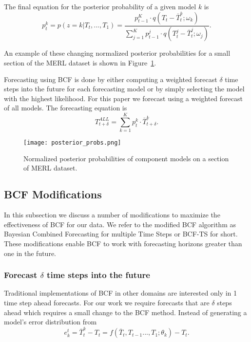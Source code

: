 The final equation for the posterior probability of a given model $k$ is
\begin{equation}
\label{eq:model_prob}
p_{t}^{k} = p(z = k|T_{t}, ..., T_{1}) = \frac{p_{t - 1}^{K} \cdot q(T_{t} - \bar{T}_{t}^{k}; \omega_{k})}{\sum_{j=1}^{K}p_{t - 1}^{j} \cdot q(T_{t}^{j} - \bar{T}_{t}^{j}; \omega_{j})}.
\end{equation}

An example of these changing normalized posterior probabilities for a small section of the MERL dataset is shown in Figure~\ref{fig:probsmerl}.

Forecasting using BCF is done by either computing a weighted forecast $\delta$ time steps into the future for each forecasting model or by simply selecting the model with the highest likelihood.  For this paper we forecast using a weighted forecast of all models.  The forecasting equation is
\begin{equation}
T_{t + \delta}^{ALL} = \sum_{k=1}^{K}p_{t}^{k} \cdot \bar{T}_{t + \delta}^{k}.
\end{equation}

\begin{figure}
\centering
\texttt{[image: posterior\_probs.png]}
\caption{Normalized posterior probabilities of component models on a section of MERL dataset.}
\label{fig:probsmerl}
\end{figure}

\subsection{BCF Modifications}
In this subsection we discuss a number of modifications to maximize the effectiveness of BCF for our data.  We refer to the modified BCF algorithm as Bayesian Combined Forecasting for multiple Time Steps or BCF-TS for short.  These modifications  enable BCF to work with forecasting horizons greater than one in the future.

\subsubsection{Forecast $\delta$ time steps into the future}
Traditional implementations of BCF in other domains \cite{Petridis2001, Zheng2006} are interested only in 1 time step ahead forecasts.  For our work we require forecasts that are $\delta$ steps ahead which requires a small change to the BCF method.  Instead of generating a model's error distribution from 
\begin{equation}
e^{t}_{k} = \bar{T}_{t}^{k} - T_{t} = f(\bar{T}_{t},T_{t - 1} ..., T_{1}; \theta_{k}) - T_{t}.
\end{equation}


